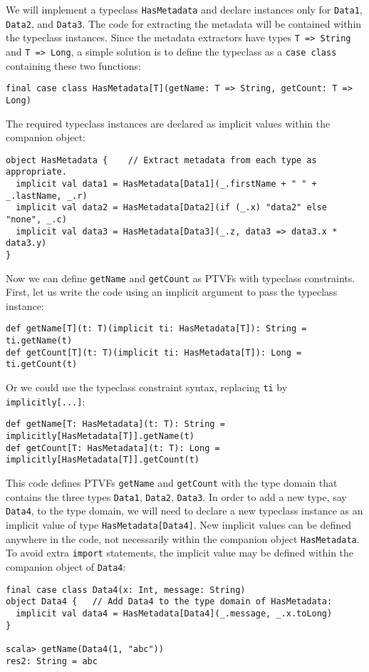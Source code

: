 We will implement a typeclass \lstinline!HasMetadata! and declare
instances only for \lstinline!Data1!, \lstinline!Data2!, and \lstinline!Data3!.
The code for extracting the metadata will be contained within the
typeclass instances. Since the metadata extractors have types \lstinline!T => String!
and \lstinline!T => Long!, a simple solution is to define the typeclass
as a \lstinline!case class! containing these two functions:
\begin{lstlisting}
final case class HasMetadata[T](getName: T => String, getCount: T => Long)
\end{lstlisting}
The required typeclass instances are declared as implicit values within
the companion object:
\begin{lstlisting}
object HasMetadata {    // Extract metadata from each type as appropriate.
  implicit val data1 = HasMetadata[Data1](_.firstName + " " + _.lastName, _.r)
  implicit val data2 = HasMetadata[Data2](if (_.x) "data2" else "none", _.c)
  implicit val data3 = HasMetadata[Data3](_.z, data3 => data3.x * data3.y)
}
\end{lstlisting}
Now we can define \lstinline!getName! and \lstinline!getCount! as
PTVFs with typeclass constraints. First, let us write the code using
an implicit argument to pass the typeclass instance:
\begin{lstlisting}
def getName[T](t: T)(implicit ti: HasMetadata[T]): String = ti.getName(t)
def getCount[T](t: T)(implicit ti: HasMetadata[T]): Long = ti.getCount(t)
\end{lstlisting}
Or we could use the typeclass constraint syntax, replacing \lstinline!ti!
by \lstinline!implicitly[...]!:
\begin{lstlisting}
def getName[T: HasMetadata](t: T): String = implicitly[HasMetadata[T]].getName(t)
def getCount[T: HasMetadata](t: T): Long = implicitly[HasMetadata[T]].getCount(t)
\end{lstlisting}

This code defines PTVFs \lstinline!getName! and \lstinline!getCount!
with the type domain that contains the three types \lstinline!Data1!,
\lstinline!Data2!, \lstinline!Data3!. In order to add a new type,
say \lstinline!Data4!, to the type domain, we will need to declare
a new typeclass instance as an implicit value of type \lstinline!HasMetadata[Data4]!.
New implicit values can be defined anywhere in the code, not necessarily
within the companion object \lstinline!HasMetadata!. To avoid extra
\lstinline!import! statements, the implicit value may be defined
within the companion object of \lstinline!Data4!:
\begin{lstlisting}
final case class Data4(x: Int, message: String)
object Data4 {   // Add Data4 to the type domain of HasMetadata:
  implicit val data4 = HasMetadata[Data4](_.message, _.x.toLong)
}

scala> getName(Data4(1, "abc"))
res2: String = abc
\end{lstlisting}

